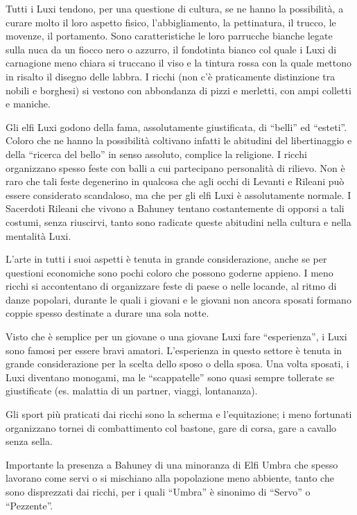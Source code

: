 
\Moda Tutti i Luxi tendono, per una questione di cultura, se ne hanno la
possibilit\`a, a curare molto il loro aspetto fisico,
l'abbigliamento, la pettinatura, il trucco, le movenze, il portamento.
Sono caratteristiche le loro parrucche bianche legate sulla nuca da un
fiocco nero o azzurro, il fondotinta bianco col quale i Luxi di
carnagione meno chiara si truccano il viso e la tintura rossa con la
quale mettono in risalto il disegno delle labbra. I ricchi (non
c'\`e praticamente distinzione tra nobili e borghesi) si vestono con
abbondanza di pizzi e merletti, con ampi colletti e maniche.

Gli elfi Luxi godono della fama, assolutamente giustificata, di
``belli'' ed ``esteti''. Coloro che ne hanno la possibilit\`a
coltivano infatti le abitudini del libertinaggio e della ``ricerca del
bello'' in senso assoluto, complice la religione. I ricchi organizzano
spesso feste con balli a cui partecipano personalit\`a di rilievo.
Non \`e raro che tali feste degenerino in qualcosa che agli occhi di
Levanti e Rileani pu\`o essere considerato scandaloso, ma che per gli
elfi Luxi \`e assolutamente normale. I Sacerdoti Rileani che vivono a
Bahuney tentano costantemente di opporsi a tali costumi, senza
riuscirvi, tanto sono radicate queste abitudini nella cultura e nella
mentalit\`a Luxi.

L'arte in tutti i suoi aspetti \`e tenuta in grande considerazione,
anche se per questioni economiche sono pochi coloro che possono
goderne appieno. I meno ricchi si accontentano di organizzare feste di
paese o nelle locande, al ritmo di danze popolari, durante le quali i
giovani e le giovani non ancora sposati formano coppie spesso
destinate a durare una sola notte.

Visto che
\`e semplice per un giovane o una giovane Luxi fare ``esperienza'',
i Luxi sono famosi per essere bravi amatori. L'esperienza in questo
settore \`e tenuta in grande considerazione per la scelta dello
sposo o della sposa. Una volta sposati, i Luxi diventano monogami, ma
le ``scappatelle'' sono quasi sempre tollerate se giustificate (es.
malattia di un partner, viaggi, lontananza). 

Gli sport pi\`u
praticati dai ricchi sono la scherma e l'equitazione; i meno
fortunati organizzano tornei di combattimento col bastone, gare di
corsa, gare a cavallo senza sella.

Importante la presenza a Bahuney di una minoranza di Elfi Umbra che
spesso lavorano come servi o si mischiano alla popolazione meno
abbiente, tanto che sono disprezzati dai ricchi, per i quali ``Umbra''
\`e sinonimo di ``Servo'' o ``Pezzente''.

